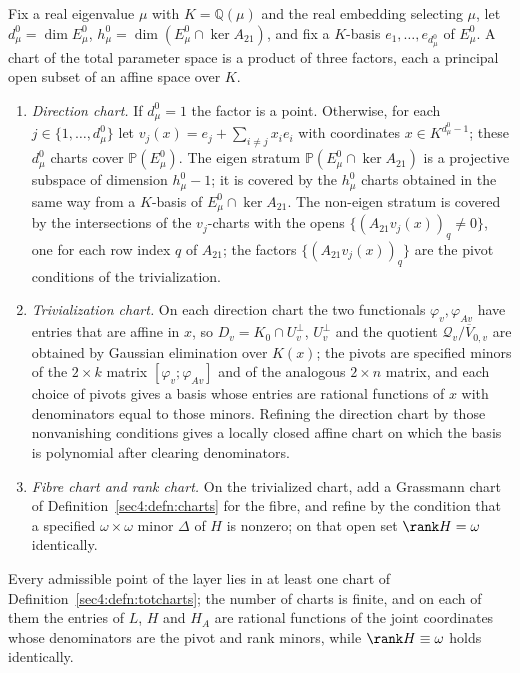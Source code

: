 \begin{defn}
\label{sec4:defn:totcharts}
Fix a real eigenvalue $\mu$ with $K=\mathbb Q(\mu)$ and the real embedding selecting $\mu$, let
$d_\mu^0=\dim E_\mu^0$, $h_\mu^0=\dim(E_\mu^0\cap\ker A_{21})$, and fix a $K$-basis
$e_1,\dots,e_{d_\mu^0}$ of $E_\mu^0$. A chart of the total parameter space is a product of three
factors, each a principal open subset of an affine space over $K$.
\begin{enumerate}[label=(\roman*),leftmargin=*]
\item \emph{Direction chart.} If $d_\mu^0=1$ the factor is a point. Otherwise, for each
$j\in\{1,\dots,d_\mu^0\}$ let $v_j(x)=e_j+\sum_{i\ne j}x_i e_i$ with coordinates $x\in K^{d_\mu^0-1}$;
these $d_\mu^0$ charts cover $\mathbb P(E_\mu^0)$. The eigen stratum
$\mathbb P(E_\mu^0\cap\ker A_{21})$ is a projective subspace of dimension $h_\mu^0-1$; it is covered by
the $h_\mu^0$ charts obtained in the same way from a $K$-basis of $E_\mu^0\cap\ker A_{21}$. The non-eigen
stratum is covered by the intersections of the $v_j$-charts with the opens
$\{(A_{21}v_j(x))_q\ne0\}$, one for each row index $q$ of $A_{21}$; the factors
$\{(A_{21}v_j(x))_q\}$ are the pivot conditions of the trivialization.
\item \emph{Trivialization chart.} On each direction chart the two functionals $\varphi_v,\varphi_{Av}$
have entries that are affine in $x$, so $D_v=K_0\cap U_v^\perp$, $U_v^\perp$ and the quotient
$\mathcal Q_v/\overline V_{0,v}$ are obtained by Gaussian elimination over $K(x)$; the pivots are
specified minors of the $2\times k$ matrix $[\varphi_v;\varphi_{Av}]$ and of the analogous
$2\times n$ matrix, and each choice of pivots gives a basis whose entries are rational functions of $x$
with denominators equal to those minors. Refining the direction chart by those nonvanishing conditions
gives a locally closed affine chart on which the basis is polynomial after clearing denominators.
\item \emph{Fibre chart and rank chart.} On the trivialized chart, add a Grassmann chart of
Definition~\ref{sec4:defn:charts} for the fibre, and refine by the condition that a specified
$\omega\times\omega$ minor $\Delta$ of $H$ is nonzero; on that open set $\rank H=\omega$ identically.
\end{enumerate}
\end{defn}

\begin{lem}\label{sec4:lem:cover}
Every admissible point of the layer lies in at least one chart of Definition~\ref{sec4:defn:totcharts};
the number of charts is finite, and on each of them the entries of $L$, $H$ and $H_A$ are rational
functions of the joint coordinates whose denominators are the pivot and rank minors, while
$\rank H\equiv\omega$ holds identically.
\end{lem}

